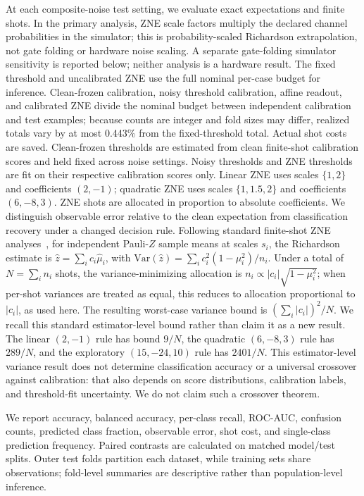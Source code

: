 \documentclass[conference]{IEEEtran}
\begin{document}
At each composite-noise test setting, we evaluate exact expectations and finite shots. In the primary analysis, ZNE scale factors multiply the declared channel probabilities in the simulator; this is probability-scaled Richardson extrapolation, not gate folding or hardware noise scaling. A separate gate-folding simulator sensitivity is reported below; neither analysis is a hardware result. The fixed threshold and uncalibrated ZNE use the full nominal per-case budget for inference. Clean-frozen calibration, noisy threshold calibration, affine readout, and calibrated ZNE divide the nominal budget between independent calibration and test examples; because counts are integer and fold sizes may differ, realized totals vary by at most 0.443\% from the fixed-threshold total. Actual shot costs are saved. Clean-frozen thresholds are estimated from clean finite-shot calibration scores and held fixed across noise settings. Noisy thresholds and ZNE thresholds are fit on their respective calibration scores only. Linear ZNE uses scales $\{1,2\}$ and coefficients $(2,-1)$; quadratic ZNE uses scales $\{1,1.5,2\}$ and coefficients $(6,-8,3)$. ZNE shots are allocated in proportion to absolute coefficients. We distinguish observable error relative to the clean expectation from classification recovery under a changed decision rule. Following standard finite-shot ZNE analyses~\cite{scavino2026,mohammadipourli2025}, for independent Pauli-$Z$ sample means at scales $s_i$, the Richardson estimate is $\hat z=\sum_i c_i\hat\mu_i$, with $\mathrm{Var}(\hat z)=\sum_i c_i^2(1-\mu_i^2)/n_i$. Under a total of $N=\sum_i n_i$ shots, the variance-minimizing allocation is $n_i\propto |c_i|\sqrt{1-\mu_i^2}$; when per-shot variances are treated as equal, this reduces to allocation proportional to $|c_i|$, as used here. The resulting worst-case variance bound is $(\sum_i|c_i|)^2/N$. We recall this standard estimator-level bound rather than claim it as a new result. The linear $(2,-1)$ rule has bound $9/N$, the quadratic $(6,-8,3)$ rule has $289/N$, and the exploratory $(15,-24,10)$ rule has $2401/N$. This estimator-level variance result does not determine classification accuracy or a universal crossover against calibration: that also depends on score distributions, calibration labels, and threshold-fit uncertainty. We do not claim such a crossover theorem.

We report accuracy, balanced accuracy, per-class recall, ROC-AUC, confusion counts, predicted class fraction, observable error, shot cost, and single-class prediction frequency. Paired contrasts are calculated on matched model/test splits. Outer test folds partition each dataset, while training sets share observations; fold-level summaries are descriptive rather than population-level inference.
\end{document}
